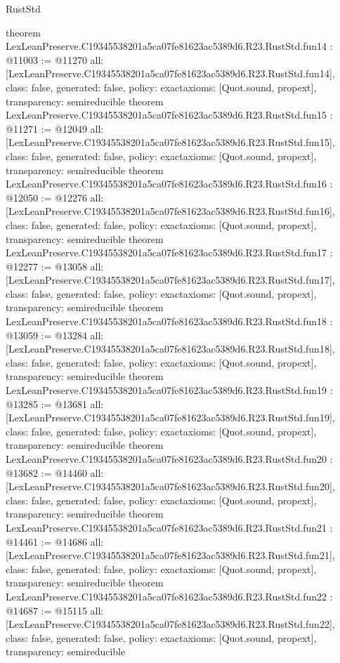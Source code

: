 \begin{lexlean}{RustStd}
\begin{coremodule}
{}
theorem LexLeanPreserve.C19345538201a5ca07fe81623ac5389d6.R23.RustStd.fun14 : @11003 := @11270 {
  all: [LexLeanPreserve.C19345538201a5ca07fe81623ac5389d6.R23.RustStd.fun14],
  class: false,
  generated: false,
  policy: exact{axioms: [Quot.sound, propext]},
  transparency: semireducible
}
theorem LexLeanPreserve.C19345538201a5ca07fe81623ac5389d6.R23.RustStd.fun15 : @11271 := @12049 {
  all: [LexLeanPreserve.C19345538201a5ca07fe81623ac5389d6.R23.RustStd.fun15],
  class: false,
  generated: false,
  policy: exact{axioms: [Quot.sound, propext]},
  transparency: semireducible
}
theorem LexLeanPreserve.C19345538201a5ca07fe81623ac5389d6.R23.RustStd.fun16 : @12050 := @12276 {
  all: [LexLeanPreserve.C19345538201a5ca07fe81623ac5389d6.R23.RustStd.fun16],
  class: false,
  generated: false,
  policy: exact{axioms: [Quot.sound, propext]},
  transparency: semireducible
}
theorem LexLeanPreserve.C19345538201a5ca07fe81623ac5389d6.R23.RustStd.fun17 : @12277 := @13058 {
  all: [LexLeanPreserve.C19345538201a5ca07fe81623ac5389d6.R23.RustStd.fun17],
  class: false,
  generated: false,
  policy: exact{axioms: [Quot.sound, propext]},
  transparency: semireducible
}
theorem LexLeanPreserve.C19345538201a5ca07fe81623ac5389d6.R23.RustStd.fun18 : @13059 := @13284 {
  all: [LexLeanPreserve.C19345538201a5ca07fe81623ac5389d6.R23.RustStd.fun18],
  class: false,
  generated: false,
  policy: exact{axioms: [Quot.sound, propext]},
  transparency: semireducible
}
theorem LexLeanPreserve.C19345538201a5ca07fe81623ac5389d6.R23.RustStd.fun19 : @13285 := @13681 {
  all: [LexLeanPreserve.C19345538201a5ca07fe81623ac5389d6.R23.RustStd.fun19],
  class: false,
  generated: false,
  policy: exact{axioms: [Quot.sound, propext]},
  transparency: semireducible
}
theorem LexLeanPreserve.C19345538201a5ca07fe81623ac5389d6.R23.RustStd.fun20 : @13682 := @14460 {
  all: [LexLeanPreserve.C19345538201a5ca07fe81623ac5389d6.R23.RustStd.fun20],
  class: false,
  generated: false,
  policy: exact{axioms: [Quot.sound, propext]},
  transparency: semireducible
}
theorem LexLeanPreserve.C19345538201a5ca07fe81623ac5389d6.R23.RustStd.fun21 : @14461 := @14686 {
  all: [LexLeanPreserve.C19345538201a5ca07fe81623ac5389d6.R23.RustStd.fun21],
  class: false,
  generated: false,
  policy: exact{axioms: [Quot.sound, propext]},
  transparency: semireducible
}
theorem LexLeanPreserve.C19345538201a5ca07fe81623ac5389d6.R23.RustStd.fun22 : @14687 := @15115 {
  all: [LexLeanPreserve.C19345538201a5ca07fe81623ac5389d6.R23.RustStd.fun22],
  class: false,
  generated: false,
  policy: exact{axioms: [Quot.sound, propext]},
  transparency: semireducible
}
\end{coremodule}
\end{lexlean}
